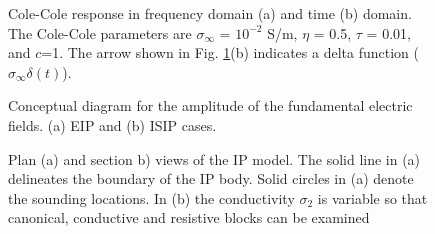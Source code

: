 \documentclass[extra,mreferee]{gji}
\newcommand{\siginf}{\sigma_\infty}
\begin{document}
\clearpage

\begin{figure}
  \caption{Cole-Cole response in frequency domain (a) and time (b) domain. The Cole-Cole parameters are $\siginf$ = $10^{-2}$ S/m, $\eta $ = 0.5, $\tau$ = 0.01, and $c$=1. The arrow shown in Fig. \ref{Fig:FDandTDCole}(b) indicates a delta function ($\siginf \delta(t)$). }
  \label{Fig:FDandTDCole}
\end{figure}

\begin{figure}  
  \caption{Conceptual diagram for the amplitude of the fundamental electric fields. (a) EIP and (b) ISIP cases.}
  \label{F:DCEM_F_current}
\end{figure}   

\begin{figure}
  \caption{Plan (a) and section b) views of the IP model. The solid line in (a) delineates the boundary of the IP body. Solid circles in (a) denote the sounding locations. In (b) the conductivity $\sigma_2$ is variable so that  canonical, conductive and resistive blocks can be examined}
  \label{F: IPModel}
\end{figure}
\end{document}
